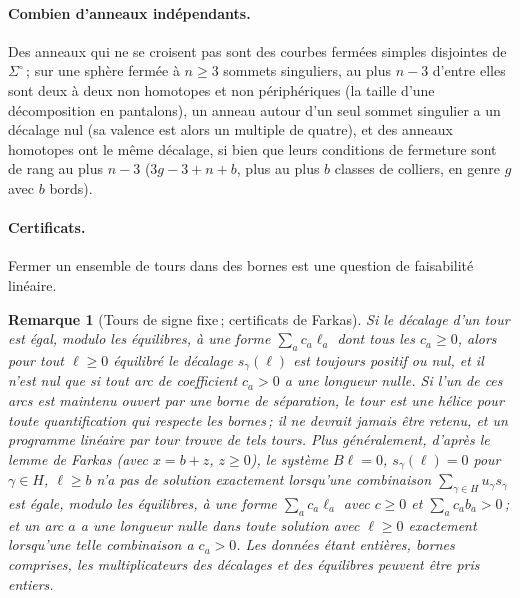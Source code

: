 \documentclass[11pt,a4paper]{article}
\newtheorem{remark}{Remarque}
\newcommand{\shift}{s}
\newcommand{\lean}[1]{\texttt{\detokenize{#1}}}
\newenvironment{evidence}[3][]{}{}
\begin{document}
\paragraph{Combien d'anneaux indépendants.}
Des anneaux qui ne se croisent pas sont des courbes fermées simples disjointes
de $\Sigma^\circ$\,; sur une sphère fermée à $n \ge 3$ sommets singuliers, au
plus $n - 3$ d'entre elles sont deux à deux non homotopes et non
périphériques (la taille d'une décomposition en pantalons), un anneau autour
d'un seul sommet singulier a un décalage nul (sa valence est alors un
multiple de quatre), et des anneaux homotopes ont le
même décalage, si bien que leurs conditions de fermeture sont de rang au plus
$n - 3$ ($3g - 3 + n + b$, plus au plus $b$ classes de colliers, en genre $g$
avec $b$ bords).

\paragraph{Certificats.}
Fermer un ensemble de tours dans des bornes est une question de faisabilité
linéaire.

\begin{evidence}{lean}{\lean{TMesh.not_closable_iff}, \lean{TMesh.closable_iff}}
\begin{remark}[Tours de signe fixe\,; certificats de Farkas]\label{rem:definite}
Si le décalage d'un tour est égal, modulo les équilibres, à une forme $\sum_a
c_a \ell_a$ dont tous les $c_a \ge 0$, alors pour tout $\ell \ge 0$ équilibré
le décalage $\shift_\gamma(\ell)$ est toujours positif ou nul, et il n'est nul
que si tout arc de coefficient $c_a > 0$ a une longueur nulle. Si l'un de ces
arcs est maintenu ouvert par une borne de séparation, le tour est une hélice
pour toute quantification qui respecte les bornes\,; il ne devrait jamais être
retenu, et un programme linéaire par tour trouve de tels tours. Plus
généralement, d'après le lemme de Farkas (avec $x = b + z$, $z \ge 0$), le
système $B\ell = 0$, $\shift_\gamma(\ell) = 0$ pour $\gamma \in H$, $\ell \ge
b$ n'a pas de solution exactement lorsqu'une combinaison $\sum_{\gamma \in H}
u_\gamma \shift_\gamma$ est égale, modulo les équilibres, à une forme $\sum_a
c_a \ell_a$ avec $c \ge 0$ et $\sum_a c_a b_a > 0$\,; et un arc $a$ a une
longueur nulle dans toute solution avec $\ell \ge 0$ exactement lorsqu'une
telle combinaison a $c_a > 0$. Les données étant entières, bornes comprises,
les multiplicateurs des décalages et des équilibres peuvent être pris entiers.
\end{remark}
\end{evidence}
\end{document}
